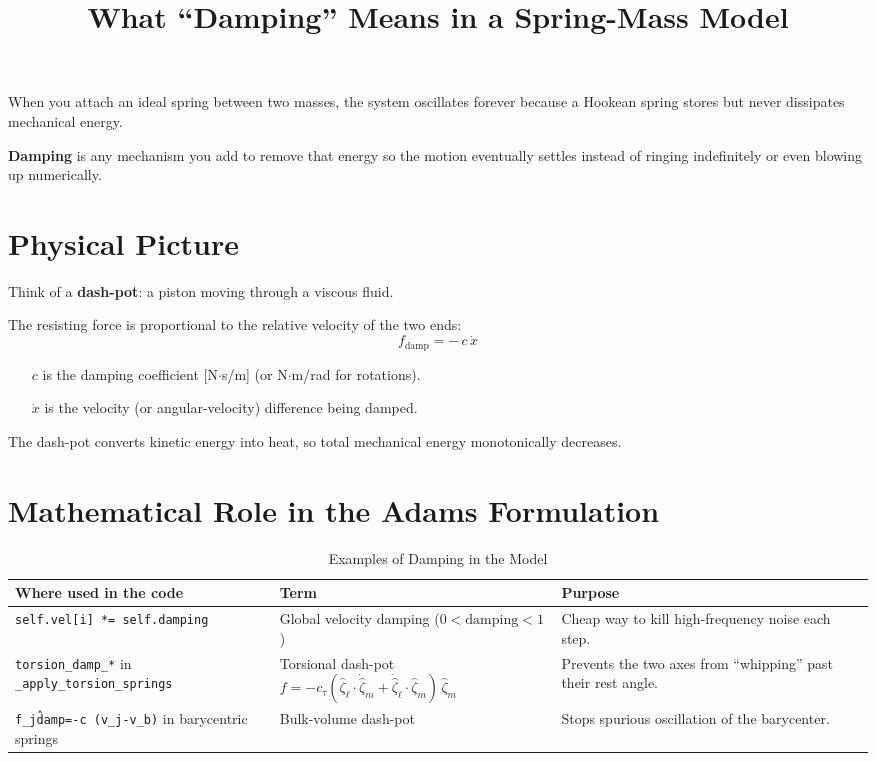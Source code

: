 \documentclass{article}
\begin{document}
\title{What “Damping” Means in a Spring-Mass Model}
\author{} %
\date{}   %
\maketitle

When you attach an ideal spring between two masses, the system oscillates forever because a Hookean spring stores but never dissipates mechanical energy.

\textbf{Damping} is any mechanism you add to remove that energy so the motion eventually settles instead of ringing indefinitely or even blowing up numerically.

\section{Physical Picture}

Think of a \textbf{dash-pot}: a piston moving through a viscous fluid.

The resisting force is proportional to the relative velocity of the two ends:
\begin{equation}
    \boxed{ \;f_\text{damp} = -\,c\,\dot{x}\;}
\end{equation}
\begin{itemize}
    \item[$c$] is the damping coefficient [N$\cdot$s/m] (or N$\cdot$m/rad for rotations).
    \item[$\dot{x}$] is the velocity (or angular-velocity) difference being damped.
\end{itemize}
The dash-pot converts kinetic energy into heat, so total mechanical energy monotonically decreases.

\hrulefill
\section{Mathematical Role in the Adams Formulation}

 \begin{table}[h!]
     \centering
     \caption{Examples of Damping in the Model}
     \label{tab:damping_terms}
     \begin{tabular}{@{}p{4cm} p{4cm} p{5cm}@{}}
         \toprule
         \textbf{Where used in the code} & \textbf{Term} & \textbf{Purpose} \\
         \midrule
         \texttt{self.vel{[}i{]} *= self.damping} & Global velocity damping ($0 < \text{damping} < 1$) & Cheap way to kill high-frequency noise each step. \\
         \addlinespace
         \texttt{torsion\_damp\_*} in \texttt{\_apply\_torsion\_springs} & Torsional dash-pot $f=-c_\tau(\hat{\zeta}_\ell \cdot \dot{\hat{\zeta}}_m + \dot{\hat{\zeta}}_\ell \cdot \hat{\zeta}_m)\,\hat{\zeta}_m$ & Prevents the two axes from “whipping” past their rest angle. \\
         \addlinespace
         \texttt{f\_j\^{damp}=-c\,(v\_j-v\_b)} in barycentric springs & Bulk-volume dash-pot & Stops spurious oscillation of the barycenter. \\
         \bottomrule
     \end{tabular}
 \end{table}
\end{document}
